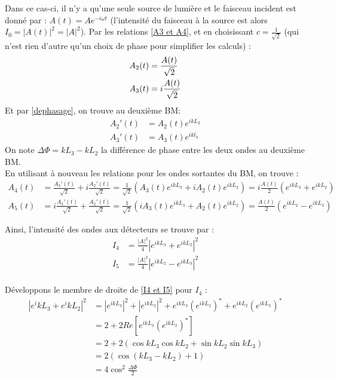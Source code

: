 \documentclass[../notesdecours.tex]{subfiles}
\begin{document}
Dans ce cas-ci, il n'y a qu'une seule source de lumière et le faisceau incident est donné par : $A(t) = Ae^{-i\omega t}$ (l'intensité du faisceau à la source est alors $I_0 = \left| A(t) \right|^2 = \left| A \right|^2$). 
Par les relations \eqref{A3 et A4}, et en choisissant $c = \frac{1}{\sqrt{2}}$ (qui n'est rien d'autre qu'un choix de phase pour simplifier les calculs) : \begin{align}
    A_2(t) &= \frac{A(t)}{\sqrt{2}} \notag \\
    A_3(t) &= i \frac{A(t)}{\sqrt{2}}
\end{align} 
Et par \eqref{dephasage}, on trouve au deuxième BM: 
\begin{align}
    A_2'(t) &= A_2(t) e^{ikL_2} \\
    A_3'(t) &= A_3(t) e^{ikl_3}
\end{align}
On note $\Delta \Phi = kL_3 - kL_2$ la différence de phase entre les deux ondes au deuxième BM. \\

En utilisant à nouveau les relations pour les ondes sortantes du BM, on trouve : 
\begin{align}
    A_4(t) &= \frac{A_3'(t)}{\sqrt{2}} + i \frac{A_2'(t)}{\sqrt{2}} = \frac{1}{\sqrt{2}} \left( A_3(t)e^{ikL_3} + i A_2(t) e^{ikL_2} \right) = i \frac{A(t)}{2} \left( e^{ikL_3} + e^{ikL_2} \right) \\
    A_5(t) &= i \frac{A_3'(t)}{\sqrt{2}} + \frac{A_2'(t)}{\sqrt{2}} = \frac{1}{\sqrt{2}} \left( iA_3(t) e^{ikL_3} + A_2(t)e^{ikL_2} \right) = \frac{A(t)}{2} \left( e^{ikL_2} - e^{ikL_3} \right) 
\end{align}

Ainsi, l'intensité des ondes aux détecteurs se trouve par : 
\begin{align}
    I_4 &= \frac{\left| A \right|^2}{4} \left| e^{ikL_3} + e^{ikL_2} \right|^2 \\ 
    I_5 &= \frac{\left| A \right|^2}{4} \left| e^{ikL_2} - e^{ikL_3} \right|^2
    \label{I4 et I5}
\end{align} \\

Développons le membre de droite de \eqref{I4 et I5} pour $I_4$ : 
\begin{align*}
    \left| e^ikL_3 + e^ikL_2 \right|^2 &= \left| e^{ikL_3} \right|^2 + \left| e^{ikL_2} \right|^2 + e^{ikL_3}(e^{ikL_2})^* + e^{ikL_2}(e^{ikL_3})^* \\
    &= 2 + 2\textit{Re}\left[ e^{ikL_3}(e^{ikL_2})^* \right] \\
    &= 2+2\left( \cos{kL_3} \cos{kL_2} + \sin{kL_2}\sin{kL_3} \right) \\
    &= 2 \left( \cos{(kL_3 - kL_2)} +1 \right) \\
    &= 4\cos^2{\frac{\Delta \Phi}{2}}
\end{align*}
\end{document}
